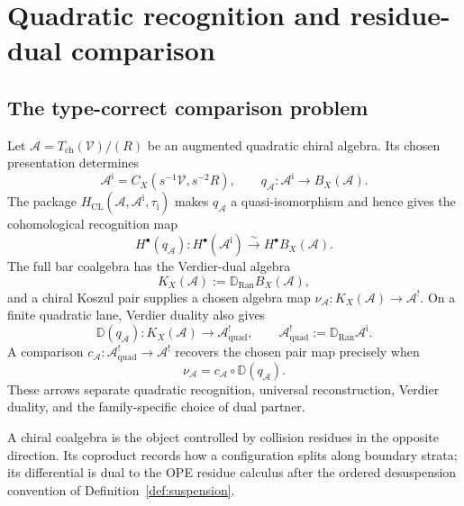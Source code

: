 
\section{Quadratic recognition and residue-dual comparison}
\label{sec:three-stage-construction}

\subsection{The type-correct comparison problem}

\begin{problem}
\label{prob:circularity}
Let
$\mathcal A=T_{\mathrm{ch}}(\mathcal V)/(R)$ be an augmented
quadratic chiral algebra.  Its chosen presentation determines
\[
 \mathcal A^{\mathrm i}
 =C_X(s^{-1}\mathcal V,s^{-2}R),
 \qquad
 q_{\mathcal A}\colon
 \mathcal A^{\mathrm i}\longrightarrow B_X(\mathcal A).
\]
The package
$H_{\mathrm{CL}}(\mathcal A,\mathcal A^{\mathrm i},
\tau_{\mathrm i})$ makes $q_{\mathcal A}$ a quasi-isomorphism and
hence gives the cohomological recognition map
\[
 H^\bullet(q_{\mathcal A})\colon
 H^\bullet(\mathcal A^{\mathrm i})
 \xrightarrow{\sim}H^\bullet B_X(\mathcal A).
\]
The full bar coalgebra has the Verdier-dual algebra
\[
 K_X(\mathcal A):=\mathbb D_{\operatorname{Ran}}B_X(\mathcal A),
\]
and a chiral Koszul pair supplies a chosen algebra map
$\nu_{\mathcal A}\colon K_X(\mathcal A)\to\mathcal A^!$.
On a finite quadratic lane, Verdier duality also gives
\[
 \mathbb D(q_{\mathcal A})\colon
 K_X(\mathcal A)\longrightarrow
 \mathcal A^!_{\mathrm{quad}},
 \qquad
 \mathcal A^!_{\mathrm{quad}}
 :=\mathbb D_{\operatorname{Ran}}\mathcal A^{\mathrm i}.
\]
A comparison
$c_{\mathcal A}\colon\mathcal A^!_{\mathrm{quad}}\to\mathcal A^!$
recovers the chosen pair map precisely when
\[
 \nu_{\mathcal A}
 =c_{\mathcal A}\circ\mathbb D(q_{\mathcal A}).
\]
These arrows separate quadratic recognition, universal
reconstruction, Verdier duality, and the family-specific choice of
dual partner.
\end{problem}

\begin{remark}
A chiral coalgebra is the object controlled by collision residues in
the opposite direction. Its coproduct records how a configuration
splits along boundary strata; its differential is dual to the OPE
residue calculus after the ordered desuspension convention of
Definition~\ref{def:suspension}.
\end{remark}


